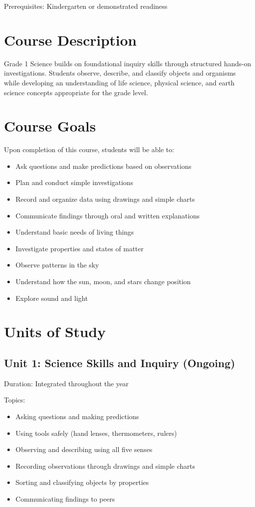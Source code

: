\documentclass[11pt,letterpaper]{report}
\begin{document}
Prerequisites: Kindergarten or demonstrated readiness

\section{Course Description}

Grade 1 Science builds on foundational inquiry skills through structured hands-on investigations. Students observe, describe, and classify objects and organisms while developing an understanding of life science, physical science, and earth science concepts appropriate for the grade level.

\section{Course Goals}

Upon completion of this course, students will be able to:

\begin{itemize}
\item Ask questions and make predictions based on observations
\item Plan and conduct simple investigations
\item Record and organize data using drawings and simple charts
\item Communicate findings through oral and written explanations
\item Understand basic needs of living things
\item Investigate properties and states of matter
\item Observe patterns in the sky
\item Understand how the sun, moon, and stars change position
\item Explore sound and light
\end{itemize}

\section{Units of Study}

\subsection{Unit 1: Science Skills and Inquiry (Ongoing)}

Duration: Integrated throughout the year

Topics:
\begin{itemize}
\item Asking questions and making predictions
\item Using tools safely (hand lenses, thermometers, rulers)
\item Observing and describing using all five senses
\item Recording observations through drawings and simple charts
\item Sorting and classifying objects by properties
\item Communicating findings to peers
\end{itemize}
\end{document}
